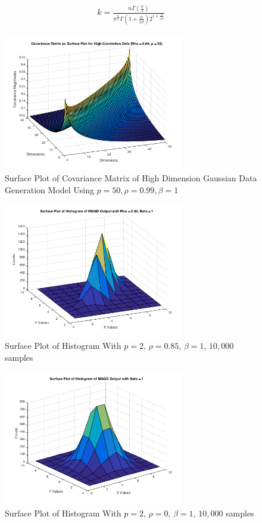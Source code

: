 \documentclass[journal]{IEEEtran}
\begin{document}
\begin{align}
\begin{split}
\label{eq:mggd_k}
k = \frac{n\Gamma(\frac{n}{2})}{\pi^{\frac{n}{2}} \Gamma(1 + \frac{n}{2\beta})2^{1+\frac{n}{2\beta}}}
\end{split}
\end{align}

\begin{figure}[h]
\centering
\includegraphics[width=3.1in]{../images/covariance.png}
\caption{Surface Plot of Covariance Matrix of High Dimension Gaussian Data Generation Model Using \(p = 50, \rho = 0.99, \beta = 1\)}
\label{fig:covariance}
\end{figure}

\begin{figure}[h]
\centering
\includegraphics[width=3.1in]{../images/hist_r_085_b_1.png}
\caption{Surface Plot of Histogram With \(p = 2\), \(\rho = 0.85\), \(\beta = 1\), \(10,000\) samples}
\label{fig:hist_r_085_b_1}
\end{figure}

\begin{figure}[h]
\centering
\includegraphics[width=3.1in]{../images/hist_b_1.png}
\caption{Surface Plot of Histogram With \(p = 2\), \(\rho = 0\), \(\beta = 1\), \(10,000\) samples}
\label{fig:hist_b_1}
\end{figure}
\end{document}
